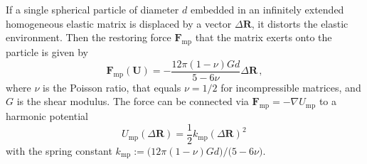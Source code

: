 \documentclass[aps,pre,twocolumn,superscriptaddress,nofootinbib]{revtex4}
\begin{document}
If a single spherical particle of diameter $d$ embedded in an infinitely extended homogeneous elastic matrix is displaced by a vector $\Delta \mathbf{R}$, it distorts the elastic environment.
Then the restoring force $\mathbf{F}_\textrm{mp}$ that the matrix exerts onto the particle is given by \cite{Phan-Thien1993_JElasticity,Phan-Thien1994_ZAngewMathPhys,Puljiz2016_PhysRevLett,Puljiz2016_arXiv}
%
\begin{equation}
	\mathbf{F}_\textrm{mp}(\mathbf{U}) = - \frac{12\pi(1 - \nu) G d}{5 - 6\nu} \Delta\mathbf{R} \, ,
	\label{Eq.force_matrix-particle}
\end{equation}
%
where $\nu$ is the Poisson ratio, that equals $\nu=1/2$ for incompressible matrices, and $G$ is the shear modulus. 
The force can be connected via $\mathbf{F}_\textrm{mp} = -\nabla U_\textrm{mp}$ to a harmonic potential
% 
\begin{equation}
	U_\textrm{mp}(\Delta\mathbf{R}) = \frac{1}{2} k_\textrm{mp} (\Delta\mathbf{R})^2 \, 
	\label{Eq.potential_matrix-particle}
\end{equation}
%
with the spring constant $k_\textrm{mp} := \big(12\pi(1 - \nu) G d \big) / \big(5 - 6\nu \big)$.
\end{document}
